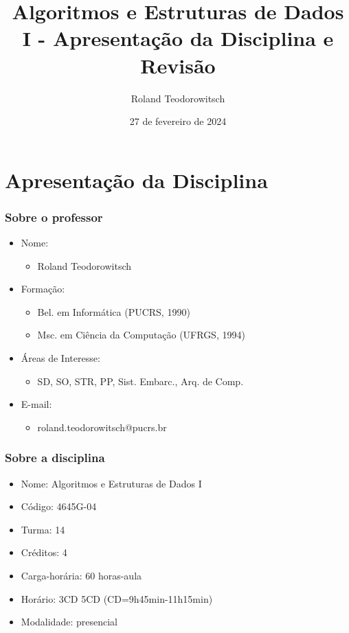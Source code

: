 \documentclass[aspectratio=169]{beamer}
\title[\sc{ALEST I - Apresentação da Disciplina e Revisão}]{Algoritmos e Estruturas de Dados I - Apresentação da Disciplina e Revisão}
\author[Roland Teodorowitsch]{Roland Teodorowitsch}
\institute[ALEST I - EP - PUCRS]{Algoritmos e Estruturas de Dados I - Escola Politécnica - PUCRS}
\date{27 de fevereiro de 2024}
\begin{document}
\justifying

\begin{frame}
	\titlepage
\end{frame}

\section{Apresenta\c{c}\~ao da Disciplina}

\begin{frame}\frametitle{Sobre o professor}
\begin{itemize}
	\item Nome:
		\begin{itemize}
			\item Roland Teodorowitsch
		\end{itemize}
	\item Forma\c{c}\~ao:
		\begin{itemize}
			\item Bel. em Inform\'atica (PUCRS, 1990)
			\item Msc. em Ci\^encia da Computa\c{c}\~ao (UFRGS, 1994)
		\end{itemize}
	\item \'Areas de Interesse:
		\begin{itemize}
			\item SD, SO, STR, PP, Sist. Embarc., Arq. de Comp.
		\end{itemize}
	\item E-mail:
		\begin{itemize}
			\item roland.teodorowitsch@pucrs.br
		\end{itemize}
\end{itemize}
\end{frame}

\begin{frame}\frametitle{Sobre a disciplina}
\begin{itemize}
	\item Nome: Algoritmos e Estruturas de Dados I
	\item Código: 4645G-04
	\item Turma: 14
	\item Cr\'editos: 4
	\item Carga-horária: 60 horas-aula
	\item Hor\'ario: 3CD 5CD (CD=9h45min-11h15min)
	\item Modalidade: presencial
\end{itemize}
\end{frame}
\end{document}
